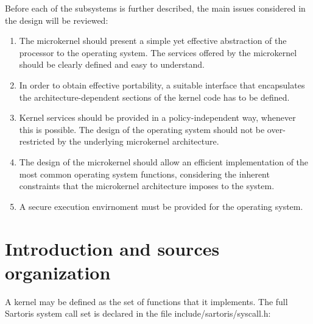 \documentclass[11pt, letterpaper, twoside, english]{book}
\begin{document}
\noindent{}Before each of the subsystems is further described, the main issues considered in the design will be reviewed:
\begin{enumerate}
\item[] The microkernel should present a simple yet effective abstraction of the processor to the operating system. The services offered by the microkernel should be clearly defined and easy to understand.
\item[] In order to obtain effective portability, a suitable interface that encapsulates the architecture-dependent sections of the kernel code has to be defined.
\item[] Kernel services should be provided in a policy-independent way, whenever this is possible. The design of the operating system should not be over-restricted by the underlying microkernel architecture.
\item[] The design of the microkernel should allow an efficient implementation of the most common operating system functions, considering the inherent constraints that the microkernel architecture imposes to the system.
\item[] A secure execution envirnoment must be provided for the operating system.
\end{enumerate}

\section{Introduction and sources organization}
A kernel may be defined as the set of functions that it implements. The full Sartoris system call set is declared in the file \textsf{include/sartoris/syscall.h}:
\end{document}
